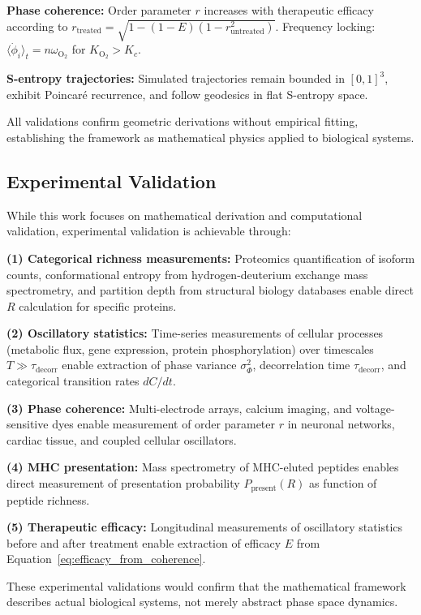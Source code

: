 \documentclass[12pt,a4paper]{article}
\theoremstyle{definition}
\theoremstyle{remark}
\newcommand{\taudecorr}{\tau_{\mathrm{decorr}}}
\begin{document}
\textbf{Phase coherence:} Order parameter $r$ increases with therapeutic efficacy according to $r_{\mathrm{treated}} = \sqrt{1 - (1-E)(1-r_{\mathrm{untreated}}^2)}$. Frequency locking: $\langle\dot{\phi}_i\rangle_t = n\omega_{\mathrm{O_2}}$ for $K_{\mathrm{O_2}} > K_c$.

\textbf{S-entropy trajectories:} Simulated trajectories remain bounded in $[0,1]^3$, exhibit Poincaré recurrence, and follow geodesics in flat S-entropy space.

All validations confirm geometric derivations without empirical fitting, establishing the framework as mathematical physics applied to biological systems.

\subsection{Experimental Validation}

While this work focuses on mathematical derivation and computational validation, experimental validation is achievable through:

\textbf{(1) Categorical richness measurements:} Proteomics quantification of isoform counts, conformational entropy from hydrogen-deuterium exchange mass spectrometry, and partition depth from structural biology databases enable direct $R$ calculation for specific proteins.

\textbf{(2) Oscillatory statistics:} Time-series measurements of cellular processes (metabolic flux, gene expression, protein phosphorylation) over timescales $T \gg \taudecorr$ enable extraction of phase variance $\sigma_\Phi^2$, decorrelation time $\taudecorr$, and categorical transition rates $dC/dt$.

\textbf{(3) Phase coherence:} Multi-electrode arrays, calcium imaging, and voltage-sensitive dyes enable measurement of order parameter $r$ in neuronal networks, cardiac tissue, and coupled cellular oscillators.

\textbf{(4) MHC presentation:} Mass spectrometry of MHC-eluted peptides enables direct measurement of presentation probability $P_{\mathrm{present}}(R)$ as function of peptide richness.

\textbf{(5) Therapeutic efficacy:} Longitudinal measurements of oscillatory statistics before and after treatment enable extraction of efficacy $E$ from Equation~\eqref{eq:efficacy_from_coherence}.

These experimental validations would confirm that the mathematical framework describes actual biological systems, not merely abstract phase space dynamics.
\end{document}
